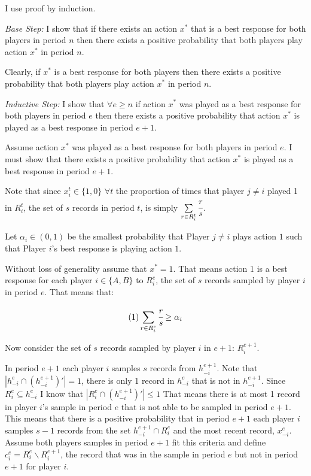 \documentclass{article}
\begin{document}
I use proof by induction.

\vskip12pt

\textit{Base Step:} I show that if there exists an action $x^*$ that is a best response for both players in period $n$ then there exists a positive probability that both players play action $x^*$ in period $n$.

\vskip6pt

Clearly, if $x^*$ is a best response for both players then there exists a positive probability that both players play action $x^*$ in period $n$.

\vskip12pt

\textit{Inductive Step:} I show that $\forall e \geq n$ if action $x^*$ was played as a best response for both players in period $e$ then there exists a positive probability that action $x^*$ is played as a best response in period $e+1$.

\vskip6pt

Assume action $x^*$ was played as a best response for both players in period $e$. I must show that there exists a positive probability that action $x^*$ is played as a best response in period $e+1$.

\vskip6pt

Note that since $x_i^t \in \{1,0\}$ \hspace{4pt} $\forall t$ the proportion of times that player $j \neq i$ played 1 in $R_i^t$, the set of $s$ records in period $t$, is simply $\sum\limits_{r \in R_i^t} \cfrac{r}{s}$.

\vskip6pt

Let $\alpha_i \in (0,1)$ be the smallest probability that Player $j \neq i$ plays action $1$ such that Player $i$'s best response is playing action $1$.

\vskip6pt

Without loss of generality assume that $x^{*}=1$. That means action 1 is a best response for each player $i \in \{A,B\}$ to $R_i^{e}$, the set of $s$ records sampled by player $i$ in period $e$. That means that:

$$ (1) \sum\limits_{r \in R_i^{e}} \cfrac{r}{s} \geq \alpha_i$$

Now consider the set of $s$ records sampled by player $i$ in $e+1$: $R_i^{e+1}$.

In period $e+1$ each player $i$ samples $s$ records from $h_{-i}^{e+1}$. Note that $|h_{-i}^{e} \cap (h_{-i}^{e+1})'|=1$, there is only 1 record in $h_{-i}^{e}$ that is not in $h_{-i}^{e+1}$. Since $R_i^{e} \subseteq h_{-i}^{e}$ I know that $|R_i^{e} \cap (h_{-i}^{e+1})'| \leq 1$ That means there is at most 1 record in player $i$'s sample in period $e$ that is not able to be sampled in period $e+1$. This means that there is a positive probability that in period $e+1$ each player $i$ samples $s-1$ records from the set $h_{-i}^{e+1} \cap R_i^{e}$ and the most recent record, $x_{-i}^{e}$. Assume both players samples in period $e+1$ fit this criteria and define $c_i^{e}=R_i^e \backslash R_i^{e+1}$, the record that was in the sample in period $e$ but not in period $e+1$ for player $i$.
\end{document}
